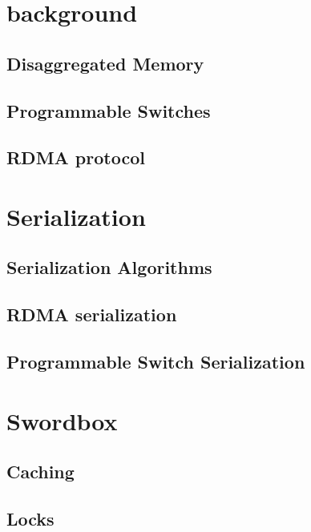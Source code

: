 \section{background}

\subsection{Disaggregated Memory}

\subsection{Programmable Switches}

\subsection{RDMA protocol}

\section{Serialization}

\subsection{Serialization Algorithms}

\subsection{RDMA serialization}

\subsection{Programmable Switch Serialization}

\section{Swordbox}

\subsection{Caching}

\subsection{Locks}
